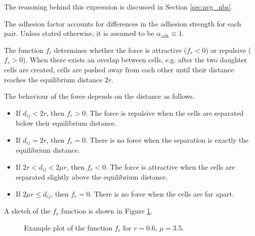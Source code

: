 The reasoning behind this expression is discussed in Section \ref{sec:avg_nbs}.

\begin{remark}
    The adhesion factor accounts for differences in the adhesion strength for each pair. Unless stated otherwise, it is assumed to be $\alpha_\text{adh}\equiv 1$.
\end{remark}

The function $f_r$ determines whether the force is attractive ($f_r<0$) or repulsive ($f_r>0$). When there exists an overlap between cells, e.g. after the two daughter cells are created, cells are pushed away from each other until their distance reaches the equilibrium distance $2r$. 

\begin{remark}\label{rk:regimes}
    The behaviour of the force depends on the distance as follows.
    \begin{itemize}
        \item If $d_{ij} < 2r$, then $f_r>0$. The force is repulsive when the cells are separated below their equilibrium distance.
        \item If $d_{ij}=2r$, then $f_r=0$. There is no force when the separation is exactly the equilibrium distance.
        \item If $2r<d_{ij}<2\mu r$, then $f_r<0$. The force is attractive when the cells are separated slightly above the equilibrium distance.
        \item If $2\mu r \leq d_{ij}$, then $f_r=0$. There is no force when the cells are far apart.
    \end{itemize}
\end{remark}

A sketch of the $f_r$ function is shown in Figure \ref{fig:force_function}.

\begin{figure}[htp] %
    \centering
    \caption{Example plot of the function $f_r$ for $r=0.6$, $\mu=3.5$.}
    \label{fig:force_function}
\end{figure}


